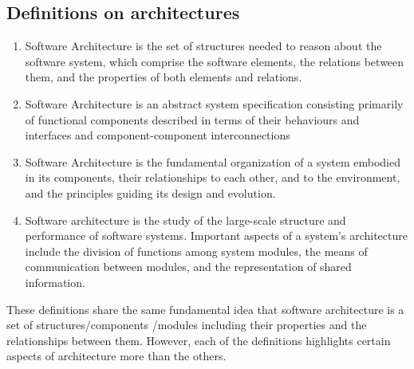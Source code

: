 \documentclass{article}
\begin{document}
\subsection{Definitions on architectures}
\begin{enumerate}
\item Software Architecture is the set of structures needed to reason about the software system, which comprise the software elements, the relations between them, and the properties of both elements and relations.\cite{clemens}

\item Software Architecture is an abstract system specification consisting primarily of functional components described in terms of their behaviours and interfaces and component-component interconnections\cite{hayesroth}

\item Software Architecture is the fundamental organization of a system embodied in its components, their relationships to each other, and to the environment, and the principles guiding its design and evolution.\cite{IEEE1471}

\item Software architecture is the study of the large-scale structure and performance of software systems. Important aspects of a system's architecture include the division of functions among system modules, the means of communication between modules, and the representation of shared information.\cite{lane90}
\end{enumerate}

These definitions share the same fundamental idea that software architecture is a set of structures/components \newline
/modules including their properties and the relationships between them. However, each of the definitions highlights certain aspects of architecture more than the others.
\end{document}
